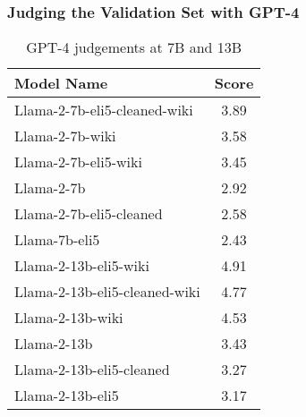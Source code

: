 \documentclass[11pt, oneside]{article}   	%
\begin{document}



\subsubsection{Judging the Validation Set with GPT-4}

\begin{table}[h]
\centering
\begin{tabular}{|l|c|}
\hline
Model Name & Score \\
\hline
Llama-2-7b-eli5-cleaned-wiki & 3.89 \\
Llama-2-7b-wiki & 3.58 \\
Llama-2-7b-eli5-wiki & 3.45 \\
Llama-2-7b & 2.92 \\
Llama-2-7b-eli5-cleaned & 2.58 \\
Llama-7b-eli5 & 2.43 \\
\hline\hline 
Llama-2-13b-eli5-wiki & 4.91 \\
Llama-2-13b-eli5-cleaned-wiki & 4.77 \\
Llama-2-13b-wiki & 4.53 \\
Llama-2-13b & 3.43 \\
Llama-2-13b-eli5-cleaned & 3.27 \\
Llama-2-13b-eli5 & 3.17 \\
\hline
\end{tabular}
\caption{GPT-4 judgements at 7B and 13B}
\end{table}
\end{document}
